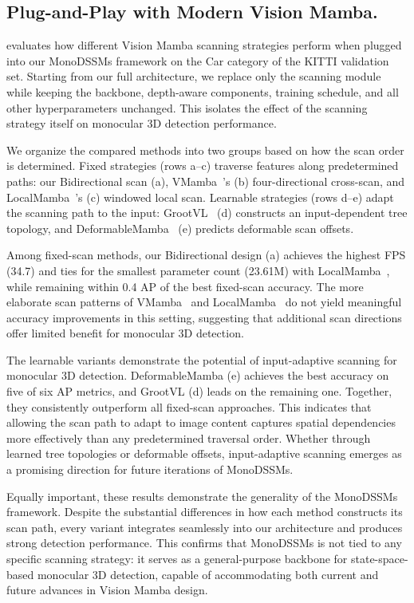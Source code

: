 \subsection{Plug-and-Play with Modern Vision Mamba.}
 evaluates how different Vision Mamba scanning strategies perform when plugged into our MonoDSSMs framework on the Car category of the KITTI validation set. Starting from our full architecture, we replace only the scanning module while keeping the backbone, depth-aware components, training schedule, and all other hyperparameters unchanged. This isolates the effect of the scanning strategy itself on monocular 3D detection performance.

\noindent We organize the compared methods into two groups based on how the scan order is determined. Fixed strategies (rows a–c) traverse features along predetermined paths: our Bidirectional scan (a), VMamba~\cite{VMamba}'s (b) four-directional cross-scan, and LocalMamba~\cite{LocalMamba}'s (c) windowed local scan. Learnable strategies (rows d–e) adapt the scanning path to the input: GrootVL~\cite{GrootVL} (d) constructs an input-dependent tree topology, and DeformableMamba~\cite{DefMamba} (e) predicts deformable scan offsets.

\noindent Among fixed-scan methods, our Bidirectional design (a) achieves the highest FPS (34.7) and ties for the smallest parameter count (23.61M) with LocalMamba~\cite{LocalMamba}, while remaining within 0.4 AP of the best fixed-scan accuracy. The more elaborate scan patterns of VMamba~\cite{VMamba} and LocalMamba~\cite{LocalMamba} do not yield meaningful accuracy improvements in this setting, suggesting that additional scan directions offer limited benefit for monocular 3D detection.

\noindent The learnable variants demonstrate the potential of input-adaptive scanning for monocular 3D detection. DeformableMamba (e) achieves the best accuracy on five of six AP metrics, and GrootVL (d) leads on the remaining one. Together, they consistently outperform all fixed-scan approaches. This indicates that allowing the scan path to adapt to image content captures spatial dependencies more effectively than any predetermined traversal order. Whether through learned tree topologies or deformable offsets, input-adaptive scanning emerges as a promising direction for future iterations of MonoDSSMs.

\noindent Equally important, these results demonstrate the generality of the MonoDSSMs framework. Despite the substantial differences in how each method constructs its scan path, every variant integrates seamlessly into our architecture and produces strong detection performance. This confirms that MonoDSSMs is not tied to any specific scanning strategy: it serves as a general-purpose backbone for state-space-based monocular 3D detection, capable of accommodating both current and future advances in Vision Mamba design.

